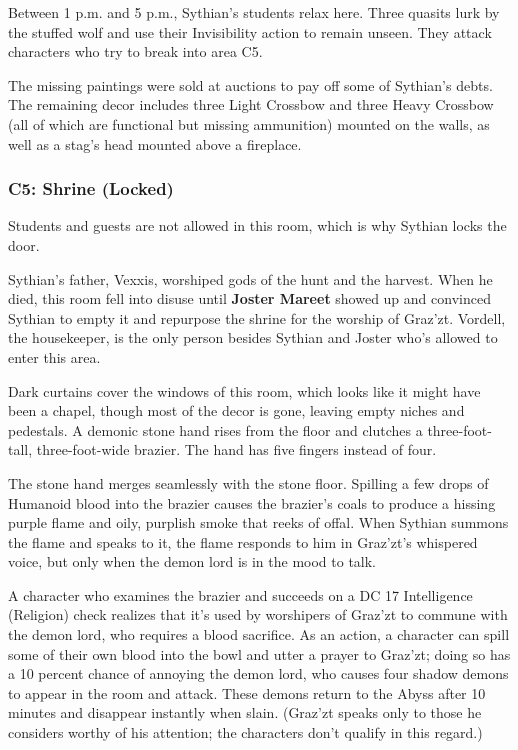 \documentclass[10pt,a4paper,twoside,bg=print,twocolumn,openany,nodeprecatedcode]{dndbook}
\begin{document}
Between 1 p.m. and 5 p.m., Sythian's students relax here. Three quasits lurk by the stuffed wolf and use their Invisibility action to remain unseen. They attack characters who try to break into area C5.

The missing paintings were sold at auctions to pay off some of Sythian's debts. The remaining decor includes three Light Crossbow and three Heavy Crossbow (all of which are functional but missing ammunition) mounted on the walls, as well as a stag's head mounted above a fireplace.

\subsubsection{C5: Shrine (Locked)}
Students and guests are not allowed in this room, which is why Sythian locks the door.

Sythian's father, Vexxis, worshiped gods of the hunt and the harvest. When he died, this room fell into disuse until \textbf{Joster Mareet} showed up and convinced Sythian to empty it and repurpose the shrine for the worship of Graz'zt. Vordell, the housekeeper, is the only person besides Sythian and Joster who's allowed to enter this area.

\begin{DndReadAloud}{}
Dark curtains cover the windows of this room, which looks like it might have been a chapel, though most of the decor is gone, leaving empty niches and pedestals. A demonic stone hand rises from the floor and clutches a three-foot-tall, three-foot-wide brazier. The hand has five fingers instead of four.

\end{DndReadAloud}

The stone hand merges seamlessly with the stone floor. Spilling a few drops of Humanoid blood into the brazier causes the brazier's coals to produce a hissing purple flame and oily, purplish smoke that reeks of offal. When Sythian summons the flame and speaks to it, the flame responds to him in Graz'zt's whispered voice, but only when the demon lord is in the mood to talk.

A character who examines the brazier and succeeds on a DC 17 Intelligence (Religion) check realizes that it's used by worshipers of Graz'zt to commune with the demon lord, who requires a blood sacrifice. As an action, a character can spill some of their own blood into the bowl and utter a prayer to Graz'zt; doing so has a 10 percent chance of annoying the demon lord, who causes four shadow demons to appear in the room and attack. These demons return to the Abyss after 10 minutes and disappear instantly when slain. (Graz'zt speaks only to those he considers worthy of his attention; the characters don't qualify in this regard.)
\end{document}
